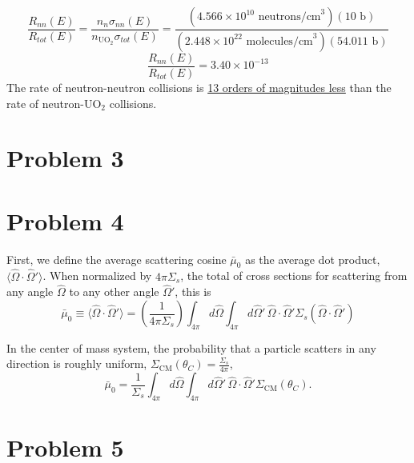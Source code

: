\documentclass{article}
\newcommand{\Oh}{\hat{\Omega}}
\begin{document}
$$ \frac{R_{nn}(E)}{R_{tot}(E)} = \frac{n_n \sigma_{nn}(E)}{n_{\text{UO}_2} \sigma_{tot}(E)} = \frac{(4.566\times10^{10}\text{ neutrons/cm}^3)(10\text{ b})}{(2.448\times10^{22}\text{ molecules/cm}^3)(54.011\text{ b})}$$
$$ \frac{R_{nn}(E)}{R_{tot}(E)} = 3.40\times10^{-13} $$
The rate of neutron-neutron collisions is \underline{13 orders of magnitudes less} than the rate of neutron-UO$_2$ collisions.



\newpage

\section*{Problem 3}




\section*{Problem 4}

First, we define the average scattering cosine $\bar{\mu}_0$ as the average dot product, $\langle \Oh \cdot \Oh' \rangle$. When normalized by $4\pi\Sigma_s$, the total of cross sections for scattering from any angle $\Oh$ to any other angle $\Oh'$, this is
$$ \bar{\mu}_0 \equiv \langle \Oh \cdot \Oh' \rangle = \left(\frac{1}{4\pi\Sigma_s}\right)  \int_{4\pi} d\Oh \int_{4\pi} d\Oh' \, \Oh \cdot \Oh' \Sigma_s(\Oh \cdot \Oh') $$

In the center of mass system, the probability that a particle scatters in any direction is roughly uniform, $\Sigma_{\text{CM}}(\theta_C) = \frac{\Sigma_s}{4\pi}$,
$$ \bar{\mu}_0 = \frac{1}{\Sigma_s}  \int_{4\pi} d\Oh \int_{4\pi} d\Oh' \, \Oh \cdot \Oh' \Sigma_{\text{CM}}(\theta_C) .$$





\section*{Problem 5}
\end{document}
